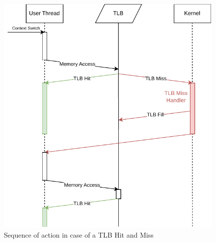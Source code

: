 \begin{figure}[t!]
    \centering
    \includegraphics[scale=1]{figures/sequence.pdf}
    \caption[Sequence of actions]{Sequence of action in case of a TLB Hit and Miss}
    \label{impl:sequence}
\end{figure}


